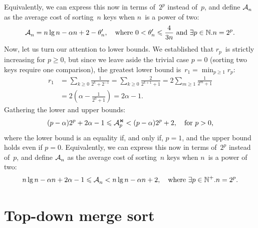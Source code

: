 Equivalently, we can express this now in terms of~\(2^p\) instead of~\(p\), and
define \(\mathcal{A}_{n}^{}\) as the average cost of sorting~\(n\) keys when \(n\)~is a
power of two:
\begin{equation*}
  \mathcal{A}_{n}^{} = n \lg n - \alpha n + 2 - \theta'_n,
  \quad \text{where \(0 < \theta'_n \leqslant \frac{4}{3n}\) and \(\exists
    p \in \mathbb{N}.n=2^p\).}
\end{equation*}
Now, let us turn our attention to lower bounds. We established that \(r_p\)~is
strictly increasing for \(p \geqslant 0\), but since we leave aside the trivial
case \(p=0\) (sorting two keys require one comparison), the greatest lower bound
is~\(r_1 = \min_{p \geqslant 1}r_p\):
\begin{align*}
  r_1
  &= \sum_{k \geqslant 0}\frac{1}{2^k + 2^{-1}}
  = \sum_{k \geqslant 0}\frac{2}{2^{k+1} + 1}
  = 2 \sum_{m \geqslant 1}\frac{1}{2^m + 1}\\
  &= 2\left(\!\alpha - \frac{1}{2^0 + 1}\!\right)
  = 2\alpha - 1.
\end{align*}
Gathering the lower and upper bounds:
\begin{equation*}
(p - \alpha)2^p + 2\alpha - 1 \leqslant \mathcal{A}_{p}^{\Join} < (p-\alpha)2^p + 2, \quad
  \text{for \(p > 0\),}
\end{equation*}
where the lower bound is an equality if, and only if, \(p = 1\), and the upper
bound holds even if \(p = 0\). Equivalently, we can express this now in terms
of~\(2^p\) instead of~\(p\), and define \(\mathcal{A}_{n}^{}\) as the average cost of
sorting~\(n\) keys when \(n\)~is a power of two:
\begin{equation}
  n \lg n - \alpha n + 2\alpha - 1 \leqslant \mathcal{A}_{n}^{} < n \lg n - \alpha n + 2,
  \quad \text{where \(\exists p \in \mathbb{N}^+.n=2^p\).}
  \label{ineq:M_join}
\end{equation}

\section{Top-down merge sort}

